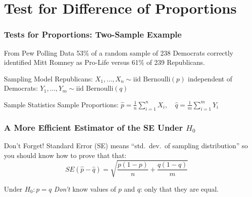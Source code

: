 \section{Test for Difference of Proportions}
\begin{frame}
	\frametitle{Tests for Proportions: Two-Sample Example}
	\begin{block}
		{From Pew Polling Data}
		53\% of a random sample of 238 Democrats correctly identified Mitt Romney as Pro-Life versus 61\% of 239 Republicans.
	\end{block}
	\begin{block}
		{Sampling Model}
		Republicans: $X_1, \hdots, X_{n} \sim \mbox{iid Bernoulli}(p)$ independent of\\
		Democrats: $Y_1, \hdots,Y_{m} \sim \mbox{iid Bernoulli}(q)$ 
	\end{block}
	\begin{block}
		{Sample Statistics}
		Sample Proportions: $\displaystyle\widehat{p} = \frac{1}{n}\sum_{i=1}^{n} X_i, \quad\displaystyle\widehat{q} = \frac{1}{m}\sum_{i=1}^{m} Y_i$
	\end{block}

	\vspace{1em}

	\hfill \alert{}
\end{frame}
\begin{frame}
	\frametitle{A More Efficient Estimator of the SE Under $H_0$}
	\begin{alertblock}
		{Don't Forget!}
		Standard Error (SE) means ``std.\ dev.\ of sampling distribution'' so you should know how to prove that that:
	$$SE(\widehat{p} - \widehat{q}) = \sqrt{\frac{p(1-p)}{n} + \frac{q(1-q)}{m}}$$
	\end{alertblock}

	\begin{block}
		{Under $H_0\colon p = q$}
		\emph{Don't} know values of $p$ and $q$: only that they are equal.
	\end{block}

\end{frame}
